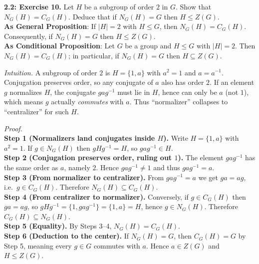 \documentclass[12pt]{article}
\theoremstyle{definition}
\begin{document}
\newpage

\newpage

\noindent \textbf{2.2: Exercise 10.} Let $H$ be a subgroup of order $2$ in $G$. Show that $N_G(H)=C_G(H)$. Deduce that if $N_G(H)=G$ then $H\le Z(G)$.\\ %

\noindent\textbf{As General Proposition}: If $|H|=2$ with $H\le G$, then $N_G(H)=C_G(H)$. Consequently, if $N_G(H)=G$ then $H\le Z(G)$.\\

\noindent \textbf{As Conditional Proposition}: Let $G$ be a group and $H\le G$ with $|H|=2$. Then $N_G(H)=C_G(H)$; in particular, if $N_G(H)=G$ then $H\subseteq Z(G)$.

\newpage

\dotfill

\emph{Intuition.} A subgroup of order $2$ is $H=\{1,a\}$ with $a^2=1$ and $a=a^{-1}$. Conjugation preserves order, so any conjugate of $a$ also has order $2$. If an element $g$ normalizes $H$, the conjugate $gag^{-1}$ must lie in $H$, hence can only be $a$ (not $1$), which means $g$ actually \emph{commutes} with $a$. Thus “normalizer” collapses to “centralizer” for such $H$.\\

\dotfill

\emph{Proof.}\\
\textbf{Step 1 (Normalizers land conjugates inside $H$).} Write $H=\{1,a\}$ with $a^2=1$. If $g\in N_G(H)$ then $gHg^{-1}=H$, so $gag^{-1}\in H$.\\
\textbf{Step 2 (Conjugation preserves order, ruling out $1$).} The element $gag^{-1}$ has the same order as $a$, namely $2$. Hence $gag^{-1}\neq 1$ and thus $gag^{-1}=a$.\\
\textbf{Step 3 (From normalizer to centralizer).} From $gag^{-1}=a$ we get $ga=ag$, i.e.\ $g\in C_G(H)$. Therefore $N_G(H)\subseteq C_G(H)$.\\
\textbf{Step 4 (From centralizer to normalizer).} Conversely, if $g\in C_G(H)$ then $ga=ag$, so $gHg^{-1}=\{1,gag^{-1}\}=\{1,a\}=H$, hence $g\in N_G(H)$. Therefore $C_G(H)\subseteq N_G(H)$.\\
\textbf{Step 5 (Equality).} By Steps 3–4, $N_G(H)=C_G(H)$.\\
\textbf{Step 6 (Deduction to the center).} If $N_G(H)=G$, then $C_G(H)=G$ by Step 5, meaning every $g\in G$ commutes with $a$. Hence $a\in Z(G)$ and $H\le Z(G)$.\\
\end{document}
